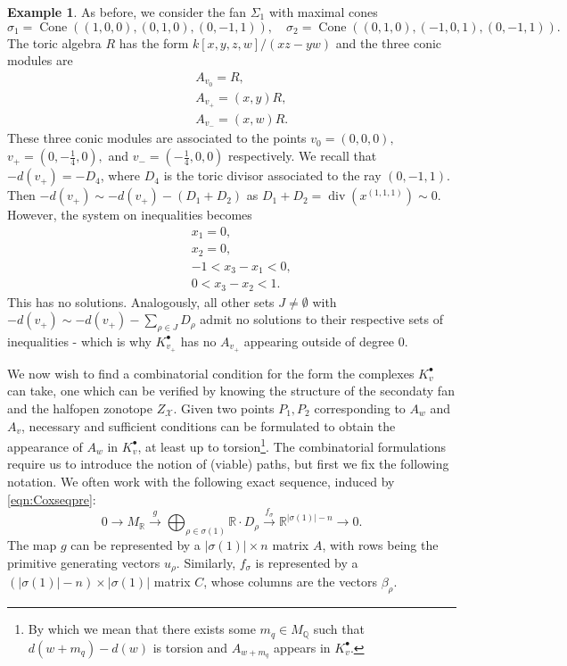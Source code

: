 \documentclass[reqno, 12pt]{amsart}
\theoremstyle{definition}
\newtheorem{example}[theorem]{Example}
\numberwithin{equation}{section}
\newcommand{\newterm}{\textsf}
\newcommand{\R}{\mathbb{R}}
\newcommand{\Q}{\mathbb{Q}}
\newcommand{\cone}{\operatorname{Cone}}
\begin{document}
\begin{example}
    \label{Exa:710Again}
    As before, we consider the fan $\Sigma_1$ with maximal cones \[
    \sigma_1=\cone((1,0,0),(0,1,0),(0,-1,1)),\quad \sigma_2=\cone((0,1,0),(-1,0,1),(0,-1,1)).
    \]
    The toric algebra $R$ has the form $k[x,y,z,w]/(xz-yw)$ and the three conic modules are\begin{eqnarray*}
        && A_{v_0}=R,\\
        && A_{v_+}=(x,y)R,\\
        && A_{v_-}=(x,w)R.
    \end{eqnarray*}
    These three conic modules are associated to the points $v_0=(0,0,0),$ $v_{+}=(0,-\frac{1}{4},0),$ and $v_-=(-\frac{1}{4},0,0)$ respectively. We recall that $-d(v_+)=-D_4$, where $D_4$ is the toric divisor associated to the ray $(0,-1,1)$. Then $-d(v_+)\sim-d(v_+)-(D_1+D_2)$ as $D_1+D_2=\operatorname{div}(x^{(1,1,1)})\sim 0$. However, the system on inequalities becomes\begin{eqnarray*}
        &&x_1=0,\\
        && x_2=0,\\
        && -1< x_3-x_1<0,\\
        &&0 < x_3-x_2<1.
    \end{eqnarray*}
    This has no solutions. Analogously, all other sets $J\neq \emptyset$ with $-d(v_+)\sim -d(v_+)-\sum_{\rho\in J}D_\rho$ admit no solutions to their respective sets of inequalities - which is why $K_{v_+}^\bullet$ has no $A_{v_+}$ appearing outside of degree 0.
\end{example}



We now wish to find a combinatorial condition for the form the complexes $K_v^\bullet$ can take, one which can be verified by knowing the structure of the secondaty fan and the halfopen zonotope $Z_{\mathcal{X}}$. Given two points $P_1, P_2$ corresponding to $A_w$ and $A_v$, necessary and sufficient conditions can be formulated to obtain the appearance of $A_w$ in $K_v^\bullet$, at least up to torsion\footnote{By which we mean that there exists some $m_q\in M_\Q$ such that $d(w+m_q)-d(w)$ is torsion and $A_{w+m_q}$ appears in $K_v^\bullet$.}. The combinatorial formulations require us to introduce the notion of \newterm{(viable) paths}, but first we fix the following notation.
We often work with the following exact sequence, induced by \eqref{eqn:Coxseqpre}:
\begin{equation}\label{eq:CoxR}
0\rightarrow M_\R\xrightarrow{g} \bigoplus_{\rho\in\sigma(1)}\R\cdot D_\rho\xrightarrow{f_{\sigma}} \R^{|\sigma(1)|-n}\rightarrow 0.
\end{equation}
The map $g$ can be represented by a $|\sigma(1)|\times n$ matrix $A$, with rows being the primitive generating vectors $u_\rho$. Similarly, $f_{\sigma}$ is represented by a $(|\sigma(1)|-n)\times |\sigma(1)|$ matrix $C$, whose columns are the vectors $\beta_\rho$. 
\end{document}

